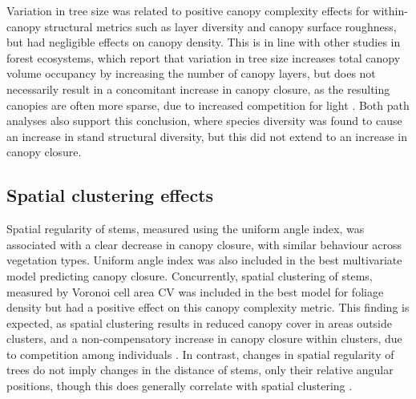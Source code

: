 \begin{refsection}
Variation in tree size was related to positive canopy complexity effects for within-canopy structural metrics such as layer diversity and canopy surface roughness, but had negligible effects on canopy density. This is in line with other studies in forest ecosystems, which report that variation in tree size increases total canopy volume occupancy by increasing the number of canopy layers, but does not necessarily result in a concomitant increase in canopy closure, as the resulting canopies are often more sparse, due to increased competition for light \citep{Beland2021a}. Both path analyses also support this conclusion, where species diversity was found to cause an increase in stand structural diversity, but this did not extend to an increase in canopy closure. 

\subsection{Spatial clustering effects}
\label{tls:ssec:clustering}

Spatial regularity of stems, measured using the uniform angle index, was associated with a clear decrease in canopy closure, with similar behaviour across vegetation types. Uniform angle index was also included in the best multivariate model predicting canopy closure. Concurrently, spatial clustering of stems, measured by Voronoi cell area CV was included in the best model for foliage density but had a positive effect on this canopy complexity metric. This finding is expected, as spatial clustering results in reduced canopy cover in areas outside clusters, and a non-compensatory increase in canopy closure within clusters, due to competition among individuals \citep{Martens2000}. In contrast, changes in spatial regularity of trees do not imply changes in the distance of stems, only their relative angular positions, though this does generally correlate with spatial clustering \citep{Gadow2002}.


\end{refsection}
